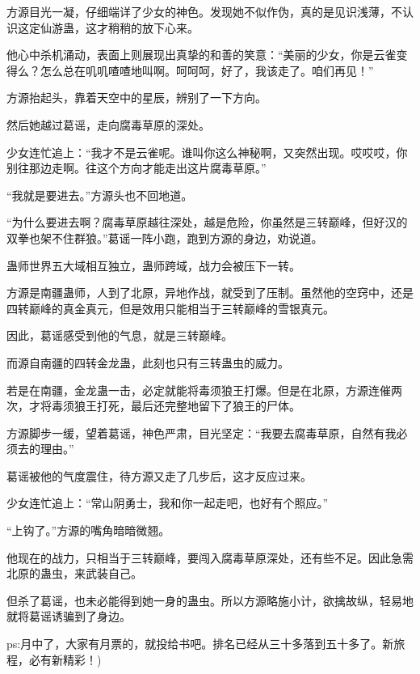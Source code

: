 \begin{this_body}
方源目光一凝，仔细端详了少女的神色。发现她不似作伪，真的是见识浅薄，不认识这定仙游蛊，这才稍稍的放下心来。

他心中杀机涌动，表面上则展现出真挚的和善的笑意：“美丽的少女，你是云雀变得么？怎么总在叽叽喳喳地叫啊。呵呵呵，好了，我该走了。咱们再见！”

方源抬起头，靠着天空中的星辰，辨别了一下方向。

然后她越过葛谣，走向腐毒草原的深处。

少女连忙追上：“我才不是云雀呢。谁叫你这么神秘啊，又突然出现。哎哎哎，你别往那边走啊。往这个方向才能走出这片腐毒草原。”

“我就是要进去。”方源头也不回地道。

“为什么要进去啊？腐毒草原越往深处，越是危险，你虽然是三转巅峰，但好汉的双拳也架不住群狼。”葛谣一阵小跑，跑到方源的身边，劝说道。

蛊师世界五大域相互独立，蛊师跨域，战力会被压下一转。

方源是南疆蛊师，人到了北原，异地作战，就受到了压制。虽然他的空窍中，还是四转巅峰的真金真元，但是效用只能相当于三转巅峰的雪银真元。

因此，葛谣感受到他的气息，就是三转巅峰。

而源自南疆的四转金龙蛊，此刻也只有三转蛊虫的威力。

若是在南疆，金龙蛊一击，必定就能将毒须狼王打爆。但是在北原，方源连催两次，才将毒须狼王打死，最后还完整地留下了狼王的尸体。

方源脚步一缓，望着葛谣，神色严肃，目光坚定：“我要去腐毒草原，自然有我必须去的理由。”

葛谣被他的气度震住，待方源又走了几步后，这才反应过来。

少女连忙追上：“常山阴勇士，我和你一起走吧，也好有个照应。”

“上钩了。”方源的嘴角暗暗微翘。

他现在的战力，只相当于三转巅峰，要闯入腐毒草原深处，还有些不足。因此急需北原的蛊虫，来武装自己。

但杀了葛谣，也未必能得到她一身的蛊虫。所以方源略施小计，欲擒故纵，轻易地就将葛谣诱骗到了身边。

ps:月中了，大家有月票的，就投给书吧。排名已经从三十多落到五十多了。新旅程，必有新精彩！)

\end{this_body}

